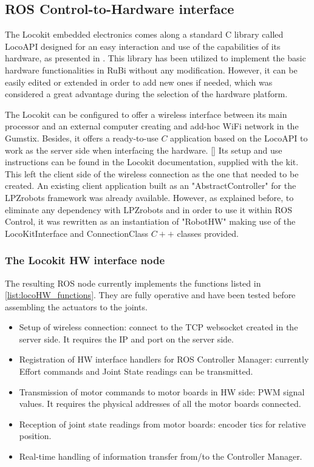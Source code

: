 \subsection{ROS Control-to-Hardware interface} %
\label{sub:ros_control_hardware_locokit_interface}
The Locokit embedded electronics comes along a standard C library called LocoAPI designed for an easy interaction and use of the capabilities of its hardware, as presented in \cite{locokit}.
This library has been utilized to implement the basic hardware functionalities in RuBi without any modification.
However, it can be easily edited or extended in order to add new ones if needed, which was considered a great advantage during the selection of the hardware platform.

The Locokit can be configured to offer a wireless interface between its main processor and an external computer creating and add-hoc WiFi network in the Gumstix.
Besides, it offers a ready-to-use $C$ application based on the LocoAPI to work as the server side when interfacing the hardware. \ref{} 
Its setup and use instructions can be found in the Locokit documentation, supplied with the kit.
This left the client side of the wireless connection as the one that needed to be created.
An existing client application built as an "AbstractController" for the LPZrobots framework was already available. 
However, as explained before, to eliminate any dependency with LPZrobots and in order to use it within ROS Control, it was rewritten as an instantiation of "RobotHW" making use of the LocoKitInterface and ConnectionClass $C++$ classes provided.

\subsubsection{The Locokit HW interface node} %
\label{ssub:the_locokit_hw_interface}
The resulting ROS node currently implements the functions listed in \ref{list:locoHW_functions}.
They are fully operative and have been tested before assembling the actuators to the joints.

\begin{itemize}
\label{list:locoHW_functions}
	\item Setup of wireless connection: connect to the TCP websocket created in the server side. It requires the IP and port on the server side.
	\item Registration of HW interface handlers for ROS Controller Manager: currently Effort commands and Joint State readings can be transmitted.
	\item Transmission of motor commands to motor boards in HW side: PWM signal values. It requires the physical addresses of all the motor boards connected.
	\item Reception of joint state readings from motor boards: encoder tics for relative position.
	\item Real-time handling of information transfer from/to the Controller Manager.
\end{itemize}

